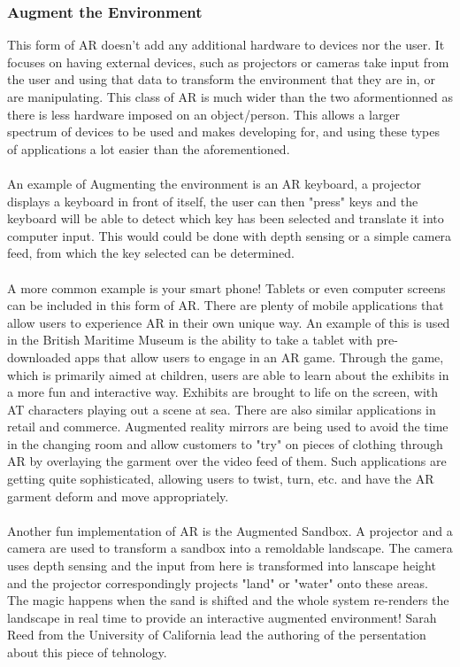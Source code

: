 \documentclass[11pt]{article}
\begin{document}
\subsubsection{Augment the Environment} 
This form of AR doesn't add any additional hardware to devices nor the user.
It focuses on having external devices, such as projectors or cameras take 
input from the user and using that data to transform the environment that they 
are in, or are manipulating. This class of AR is much wider than the two 
aformentionned as there is less hardware imposed on an object/person. This 
allows a larger spectrum of devices to be used and makes developing for,
and using these types of applications a lot easier than the aforementioned. \\
\\
An example of Augmenting the environment is an AR keyboard, a projector displays
a keyboard in front of itself, the user can then "press" keys and
the keyboard will be able to detect which key has been selected and translate it 
into computer input. This would could be done with depth sensing or a
simple camera feed, from which the key selected can be determined.\\
\\
A more common example is your smart phone! Tablets or even computer screens 
can be included in this form of AR. There are plenty of mobile applications that
allow users to experience AR in their own unique way. An example of this is
used in the British Maritime Museum is the ability to take a tablet 
with pre-downloaded apps
that allow users to engage in an AR game. Through the game, which is primarily
aimed at children, users are able to learn about the exhibits in a more fun and
interactive way. Exhibits are brought to life on the screen, with
AT characters playing out a scene at sea. 
There are also similar applications in retail and
commerce. Augmented reality mirrors are being used to avoid the time in the
changing room and allow customers to "try" on pieces of clothing through
AR by overlaying the garment over the video feed of them. Such applications
are getting quite sophisticated, allowing users to twist, turn, etc. and
have the AR garment deform and move appropriately.\\
\\
Another fun implementation of AR is the Augmented Sandbox. A projector and
a camera are used to transform a sandbox into a remoldable landscape. The camera
uses depth sensing and the input from here is transformed into lanscape height
and the projector correspondingly projects "land" or "water" onto these areas.
The magic happens when the sand is shifted and the whole system re-renders the
landscape in real time to provide an interactive augmented environment! Sarah
Reed from the University of California lead the authoring of the persentation
about this piece of tehnology\cite{Reed14}.
\end{document}
